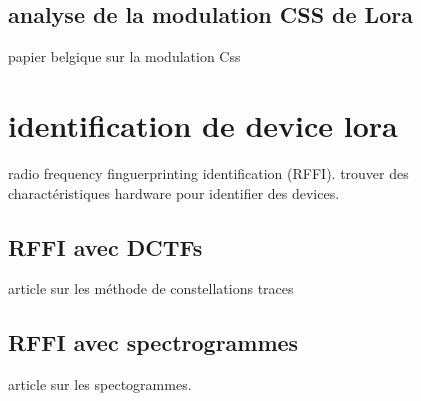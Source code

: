 \subsection{analyse de la modulation CSS de Lora}

papier belgique sur la modulation Css

\section{identification de device lora}

radio frequency finguerprinting identification (RFFI). trouver des charactéristiques hardware pour identifier des devices.

\subsection{RFFI avec DCTFs}
article sur les méthode de constellations traces

\subsection{RFFI avec spectrogrammes}
article sur les spectogrammes.